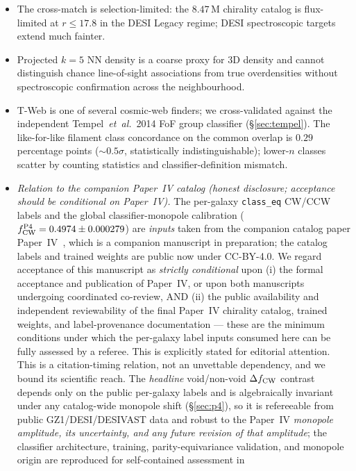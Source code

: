 \documentclass[aps,prd,twocolumn,superscriptaddress,showpacs,preprintnumbers,nofootinbib,longbibliography,floatfix]{revtex4-2}
\newcommand{\paperIVarxiv}{companion manuscript in preparation}
\begin{document}
\begin{itemize}
\item The cross-match is selection-limited: the $8.47$\,M chirality
catalog is flux-limited at $r\!\le\!17.8$ in the DESI Legacy regime;
DESI spectroscopic targets extend much fainter.
\item Projected $k\!=\!5$ NN density is a coarse proxy for 3D density
and cannot distinguish chance line-of-sight associations from true
overdensities without spectroscopic confirmation across the
neighbourhood.
\item T-Web is one of several cosmic-web finders; we cross-validated
against the independent Tempel~\textit{et~al.}~2014 \cite{Tempel2014}
FoF group classifier (\S\ref{sec:tempel}). The like-for-like filament
class
concordance on the common overlap is $0.29$\,percentage points
(${\sim}0.5\sigma$, statistically indistinguishable); lower-$n$
classes scatter by counting statistics and
classifier-definition mismatch.
\item \emph{Relation to the companion Paper~IV catalog
(honest disclosure; acceptance should be conditional on Paper~IV).}
The per-galaxy \texttt{class\_eq} CW/CCW labels and
the global classifier-monopole calibration ($f_{\rm CW}^{\rm P4} =
0.4974 \pm 0.000279$) are \emph{inputs} taken from the companion catalog
paper Paper~IV~\cite{golden_chirality_2026}, which is a
\paperIVarxiv; the catalog labels and trained weights are public now under
CC-BY-4.0. We regard acceptance of this manuscript as \emph{strictly
conditional} upon (i) the formal acceptance and publication of Paper~IV,
or upon both manuscripts undergoing coordinated co-review, AND (ii) the
public availability and independent reviewability of the final Paper~IV
chirality catalog, trained weights, and label-provenance documentation ---
these are the minimum conditions under which the per-galaxy label
inputs consumed here can be fully assessed by a referee. This is
explicitly stated for editorial attention. This is a citation-timing relation, not an
unvettable dependency, and we bound its scientific reach. The \emph{headline}
void/non-void $\Delta f_{\rm CW}$ contrast depends only on the public
per-galaxy labels and is algebraically invariant under any catalog-wide
monopole shift (\S\ref{sec:p4}), so it is refereeable from public
GZ1/DESI/DESIVAST data and robust to the Paper~IV \emph{monopole amplitude,
its uncertainty, and any future revision of that amplitude}; the classifier
architecture, training, parity-equivariance validation, and monopole origin
are reproduced for self-contained assessment in

\end{itemize}
\end{document}
